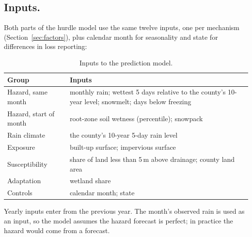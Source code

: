 \documentclass[10pt,twocolumn]{article}
\begin{document}

\subsection{Inputs.} Both parts of the hurdle model use the same twelve inputs, one per mechanism (Section~\ref{sec:factors}), plus calendar month for seasonality and state for differences in loss reporting:

\begin{table}[H]
\centering
\small
{}
\setlength{\aboverulesep}{0pt}
\setlength{\belowrulesep}{0pt}
\renewcommand{\arraystretch}{1.25}
\begin{tabularx}{\linewidth}{@{}lL@{}}
\toprule
Group & Inputs \\
\midrule
Hazard, same month     & monthly rain; wettest 5 days relative to the county's 10-year level; snowmelt; days below freezing \\
Hazard, start of month & root-zone soil wetness (percentile); snowpack \\
Rain climate           & the county's 10-year 5-day rain level \\
Exposure               & built-up surface; impervious surface \\
Susceptibility         & share of land less than 5\,m above drainage; county land area \\
Adaptation             & wetland share \\
Controls               & calendar month; state \\
\bottomrule
\end{tabularx}
\caption{Inputs to the prediction model.}
\label{tab:pred-inputs}
\end{table}

Yearly inputs enter from the previous year. The month's observed rain is used
as an input, so the model assumes the hazard forecast is perfect; in practice
the hazard would come from a forecast.
\end{document}
